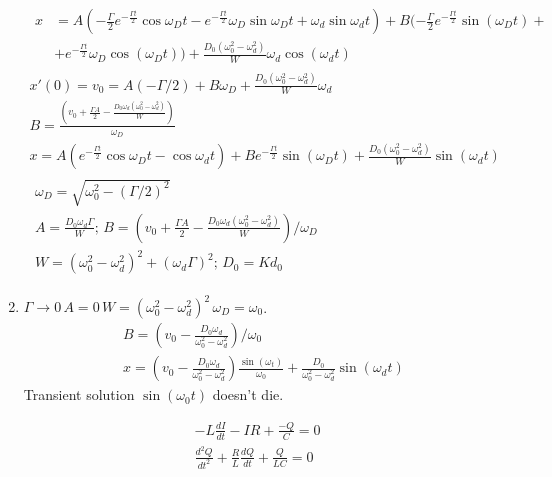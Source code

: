 \documentclass[twoside,10pt]{amsart}
\newcommand{\problemhead}[1]
  {\smallskip
   \noindent{\large\bf Problem #1.}
   \smallskip}
\begin{document}
\begin{enumerate}
\[\begin{gathered}
\begin{aligned}
  x &= A ( -\frac{ \Gamma}{2} e^{ - \frac{ \Gamma t}{2} } \cos{ \omega_D t } -e^{ - \frac{ \Gamma t }{ 2 } } \omega_D \sin{ \omega_D t } + \omega_d \sin{ \omega_d t } ) + B (- \frac{\Gamma}{2} e^{ - \frac{ \Gamma t }{ 2}} \sin{ (\omega_D t )} + \\
  & + e^{-\frac{ \Gamma t }{2}} \omega_D \cos{ (\omega_D t ) }  ) + \frac{ D_0 (\omega_0^2 - \omega_d^2 )}{ W} \omega_d \cos{ (\omega_d t )}    
\end{aligned} \\
x'(0) = v_0 = A (-\Gamma/2) + B\omega_D + \frac{D_0 (\omega_0^2 - \omega_d^2 )}{ W} \omega_d  \\
B = \frac{ \left( v_0 + \frac{ \Gamma A}{2} - \frac{ D_0 \omega_d (\omega_0^2 - \omega_d^2 )}{ W} \right)}{ \omega_D }  \\
x = A (e^{ - \frac{ \Gamma t}{2} } \cos{\omega_D t } - \cos{ \omega_d t } ) + B e^{- \frac{\Gamma t }{2} } \sin{ (\omega_D t)} + \frac{ D_0 (\omega_0^2 - \omega_d^2 )}{ W} \sin{ (\omega_d t )}  \\
\begin{gathered}
  \omega_D = \sqrt{ \omega_0^2 - (\Gamma/2)^2 }  \\
  A = \frac{ D_0 \omega_d \Gamma }{ W}; \, B = \left( v_0 + \frac{ \Gamma A}{2} - \frac{ D_0 \omega_d (\omega_0^2 - \omega_d^2) }{ W} \right) /\omega_D  \\
  W = (\omega_0^2 - \omega_d^2)^2 + (\omega_d \Gamma)^2; \, D_0 = K d_0
\end{gathered}
\end{gathered}
\]
\item $\Gamma \to 0 \, A =0 \, W = (\omega_0^2 - \omega_d^2 )^2  \, \omega_D = \omega_0  $.  
\[
\begin{gathered}
  B = \left( v_0 - \frac{ D_0 \omega_d}{ \omega_0^2 - \omega_d^2 } \right)/\omega_0 \\
  \boxed{ x = \left( v_0 - \frac{ D_0 \omega_d }{ \omega_0^2 - \omega_d^2 } \right) \frac{ \sin{ (\omega_ t ) }}{ \omega_0}  + \frac{ D_0 }{ \omega_0^2 - \omega_d^2 } \sin{ (\omega_d t ) } }
\end{gathered}
\]
Transient solution $\sin{ (\omega_0 t )} $ doesn't die.  
\end{enumerate}

\problemhead{2.5} \[
\begin{aligned}
  & -L \frac{dI}{dt} - IR + \frac{ -Q}{C} = 0    \\
  &  \frac{d^2 Q}{ dt^2} + \frac{R}{L} \frac{dQ}{dt} + \frac{Q}{LC} = 0   
\end{aligned}
\]
\end{document}
